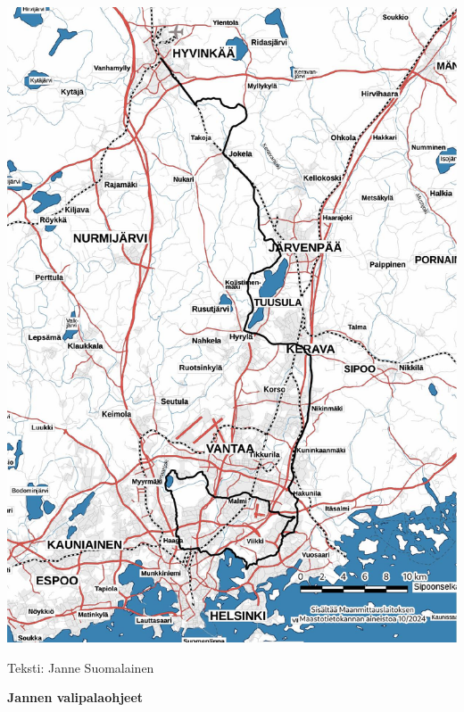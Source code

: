 \begin{multicols}{2}
\begin{Figure}
\noindent\includegraphics[width=\linewidth]{assets/mustaliljareitti.jpg}
\end{Figure}
\end{multicols}

\vspace*{.50cm}
{\raggedleft Teksti: Janne Suomalainen\par}


\clearpage
\vspace*{-1.55cm}
\large\textbf{Jannen valipalaohjeet}


